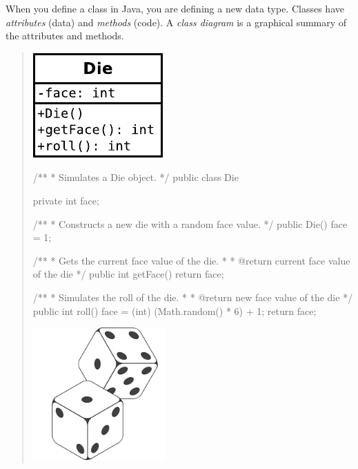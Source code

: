 \label{class-die}

When you define a class in Java, you are defining a new data type.
Classes have \emph{attributes} (data) and \emph{methods} (code).
A \emph{class diagram} is a graphical summary of the attributes and methods.

\vspace{1em}
\begin{quote}
\hfill\includegraphics{Die.pdf}
\vspace*{-84pt}

\begin{javalst}
/**
 * Simulates a Die object.
 */
public class Die {
    
    private int face;
    
    /**
     * Constructs a new die with a random face value.
     */
    public Die() {
        face = 1;
    }
    
    /**
     * Gets the current face value of the die.
     *
     * @return current face value of the die
     */
    public int getFace() {
        return face;
    }
    
    /**
     * Simulates the roll of the die.
     *
     * @return new face value of the die
     */
    public int roll() {
        face = (int) (Math.random() * 6) + 1;
        return face;
    }
    
}
\end{javalst}

\vspace*{-128pt}
\hfill\includegraphics[width=2in]{dice.png}
\end{quote}


